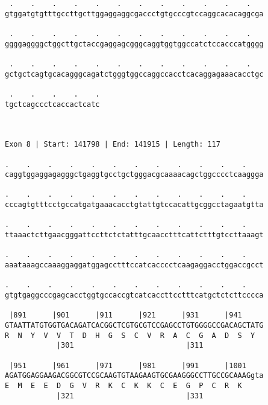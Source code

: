 \documentclass{article}
\begin{document}
\begin{Verbatim}
 .    .    .    .    .    .    .    .    .    .    .    .   
gtggatgtgtttgccttgcttggaggaggcgaccctgtgcccgtccaggcacacaggcga
                                                            
 .    .    .    .    .    .    .    .    .    .    .    .   
ggggaggggctggcttgctaccgaggagcgggcaggtggtggccatctccacccatgggg
                                                            
 .    .    .    .    .    .    .    .    .    .    .    .   
gctgctcagtgcacagggcagatctgggtggccaggccacctcacaggagaaacacctgc
                                                            
 .    .    .    .    .
tgctcagccctcaccactcatc
                      
                      
 
Exon 8 | Start: 141798 | End: 141915 | Length: 117
 
.    .    .    .    .    .    .    .    .    .    .    .    
caggtggaggagagggctgaggtgcctgctgggacgcaaaacagctggcccctcaaggga
                                                            
.    .    .    .    .    .    .    .    .    .    .    .    
cccagtgtttcctgccatgatgaaacacctgtattgtccacattgcggcctagaatgtta
                                                            
.    .    .    .    .    .    .    .    .    .    .    .    
ttaaactcttgaacgggattccttctctatttgcaacctttcattctttgtccttaaagt
                                                            
.    .    .    .    .    .    .    .    .    .    .    .    
aaataaagccaaaggaggatggagcctttccatcacccctcaagaggacctggaccgcct
                                                            
.    .    .    .    .    .    .    .    .    .    .    .    
gtgtgaggcccgagcacctggtgccaccgtcatcaccttcctttcatgctctcttcccca
                                                            
 |891      |901      |911      |921      |931      |941     
GTAATTATGTGGTGACAGATCACGGCTCGTGCGTCCGAGCCTGTGGGGCCGACAGCTATG
R  N  Y  V  V  T  D  H  G  S  C  V  R  A  C  G  A  D  S  Y  
            |301                          |311              
  
 |951      |961      |971      |981      |991      |1001    
AGATGGAGGAAGACGGCGTCCGCAAGTGTAAGAAGTGCGAAGGGCCTTGCCGCAAAGgta
E  M  E  E  D  G  V  R  K  C  K  K  C  E  G  P  C  R  K     
            |321                          |331              
  

\end{Verbatim}
\end{document}
